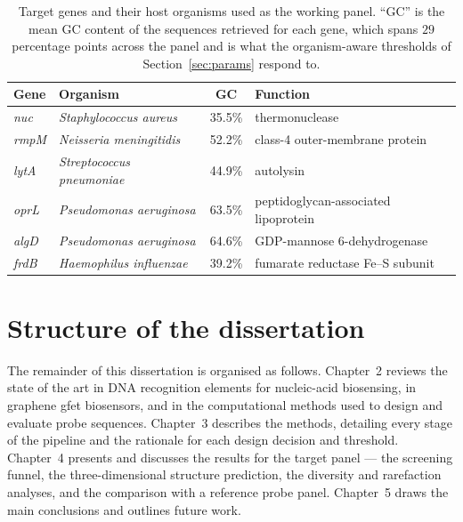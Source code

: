 \begin{table}[H]
\begin{center}
\begin{tabular}{l l c l}
\hline
\textbf{Gene} & \textbf{Organism} & \textbf{GC} & \textbf{Function} \\
\hline
\emph{nuc}  & \emph{Staphylococcus aureus}    & 35.5\% & thermonuclease \\
\emph{rmpM} & \emph{Neisseria meningitidis}   & 52.2\% & class-4 outer-membrane protein \\
\emph{lytA} & \emph{Streptococcus pneumoniae} & 44.9\% & autolysin \\
\emph{oprL} & \emph{Pseudomonas aeruginosa}   & 63.5\% & peptidoglycan-associated lipoprotein \\
\emph{algD} & \emph{Pseudomonas aeruginosa}   & 64.6\% & GDP-mannose 6-dehydrogenase \\
\emph{frdB} & \emph{Haemophilus influenzae}   & 39.2\% & fumarate reductase Fe--S subunit \\
\hline
\end{tabular}
\end{center}
\caption[Target panel]{Target genes and their host organisms used as the working panel. ``GC'' is
the mean GC content of the sequences retrieved for each gene, which spans $29$ percentage points
across the panel and is what the organism-aware thresholds of Section~\ref{sec:params} respond to.}
\label{tab:targets}
\end{table}

\section{Structure of the dissertation}

The remainder of this dissertation is organised as follows. Chapter~2 reviews the state of the art in DNA
recognition elements for nucleic-acid biosensing, in graphene \acrshort{gfet} biosensors, and in the
computational methods used to design and evaluate probe sequences. Chapter~3 describes the methods,
detailing every stage of the pipeline and the rationale for each design decision and threshold. Chapter~4
presents and discusses the results for the target panel --- the screening funnel, the three-dimensional
structure prediction, the diversity and rarefaction analyses, and the comparison with a reference
probe panel.
Chapter~5 draws the main conclusions and outlines future work.
